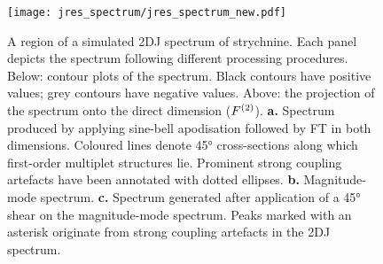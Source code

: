 \begin{figure}
{{    }
    }
    \label{fig:jres-ab}
    \vspace{20pt}
    \texttt{[image: jres\_spectrum/jres\_spectrum\_new.pdf]}%
    \caption[
        A region of a \acs{2DJ} spectrum of strychnine, processed in different
        ways.
    ]
    {%
        A region of a simulated \acs{2DJ} spectrum of strychnine.
        Each panel depicts the spectrum following different processing
        procedures. Below: contour plots of the spectrum.
        Black contours have positive values; grey contours have negative
        values.
        Above: the projection of the spectrum onto the direct dimension ($F^{(2)}$).
        \textbf{a.} Spectrum produced by applying sine-bell apodisation
        followed by \ac{FT} in both dimensions.
        Coloured lines denote \ang{45} cross-sections along which first-order
        multiplet structures lie.
        Prominent strong coupling artefacts have been annotated with dotted
        ellipses.
        \textbf{b.} Magnitude-mode spectrum.
        \textbf{c.} Spectrum generated after application of a \ang{45} shear on
        the magnitude-mode spectrum. Peaks marked with an asterisk originate
        from strong coupling artefacts in the \ac{2DJ} spectrum.
   }%
    \label{fig:jres-spectrum}%
    \end{figure}

